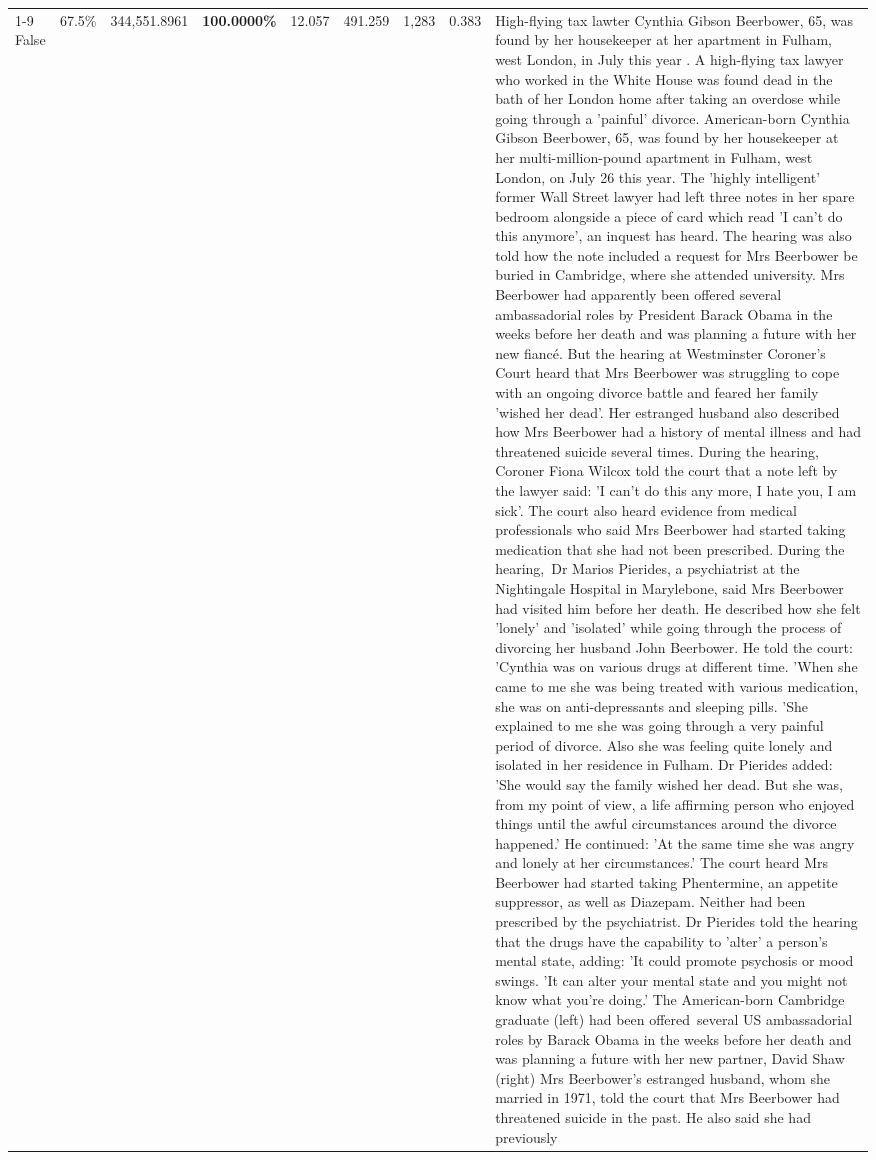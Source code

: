 \begin{table}[H]
\begin{tabular}{lllrlllll}
\cline{1-9}
False & 67.5\% & 344,551.8961 & \bfseries \color{red} 100.0000\% & 12.057 & 491.259 & 1,283 & 0.383 & High-flying tax lawter Cynthia Gibson Beerbower, 65, was found by her housekeeper at her apartment in Fulham, west London, in July this year . A high-flying tax lawyer who worked in the White House was found dead in the bath of her London home after taking an overdose while going through a 'painful' divorce. American-born Cynthia Gibson Beerbower, 65, was found by her housekeeper at her multi-million-pound apartment in Fulham, west London, on July 26 this year. The 'highly intelligent' former Wall Street lawyer had left three notes in her spare bedroom alongside a piece of card which read 'I can't do this anymore', an inquest has heard. The hearing was also told how the note included a request for Mrs Beerbower be buried in Cambridge, where she attended university. Mrs Beerbower had apparently been offered several ambassadorial roles by President Barack Obama in the weeks before her death and was planning a future with her new fiancé. But the hearing at Westminster Coroner's Court heard that Mrs Beerbower was struggling to cope with an ongoing divorce battle and feared her family 'wished her dead'. Her estranged husband also described how Mrs Beerbower had a history of mental illness and had threatened suicide several times. During the hearing, Coroner Fiona Wilcox told the court that a note left by the lawyer said: 'I can't do this any more, I hate you, I am sick'. The court also heard evidence from medical professionals who said Mrs Beerbower had started taking medication that she had not been prescribed. During the hearing, Dr Marios Pierides, a psychiatrist at the Nightingale Hospital in Marylebone, said Mrs Beerbower had visited him before her death. He described how she felt 'lonely' and 'isolated' while going through the process of divorcing her husband John Beerbower. He told the court: 'Cynthia was on various drugs at different time. 'When she came to me she was being treated with various medication, she was on anti-depressants and sleeping pills. 'She explained to me she was going through a very painful period of divorce. Also she was feeling quite lonely and isolated in her residence in Fulham. Dr Pierides added: 'She would say the family wished her dead. But she was, from my point of view, a life affirming person who enjoyed things until the awful circumstances around the divorce happened.' He continued: 'At the same time she was angry and lonely at her circumstances.' The court heard Mrs Beerbower had started taking Phentermine, an appetite suppressor, as well as Diazepam. Neither had been prescribed by the psychiatrist. Dr Pierides told the hearing that the drugs have the capability to 'alter' a person's mental state, adding: 'It could promote psychosis or mood swings. 'It can alter your mental state and you might not know what you're doing.' The American-born Cambridge graduate (left) had been offered several US ambassadorial roles by Barack Obama in the weeks before her death and was planning a future with her new partner, David Shaw (right) Mrs Beerbower's estranged husband, whom she married in 1971, told the court that Mrs Beerbower had threatened suicide in the past. He also said she had previously 
\end{tabular}
\end{table}
